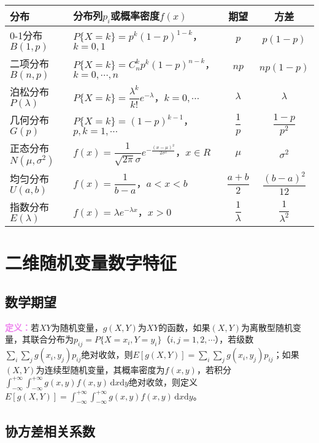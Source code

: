 \begin{center}
    \begin{tabular}{|m{50pt}<{\centering}|m{220pt}<{\centering}|c|c|}
        \hline
        分布 & 分布列$p_i$或概率密度$f(x)$ & 期望 & 方差 \\ \hline
        0-1分布$B(1,p)$ & $P\{X=k\}=p^k(1-p)^{1-k}$，$k=0,1$ & $p$ & $p(1-p)$ \\ \hline
        二项分布$B(n,p)$ & $P\{X=k\}=C_n^kp^k(1-p)^{n-k}$，$k=0,\cdots,n$ & $np$ & $np(1-p)$ \\ \hline
        泊松分布$P(\lambda)$ & $P\{X=k\}=\dfrac{\lambda^k}{k!}e^{-\lambda}$，$k=0,\cdots$ & $\lambda$ & $\lambda$ \\ \hline
        几何分布$G(p)$ & $P\{X=k\}=(1-p)^{k-1}$，$p,k=1,\cdots$ & $\dfrac{1}{p}$ & $\dfrac{1-p}{p^2}$ \\ \hline
        正态分布$N(\mu,\sigma^2)$ & $f(x)=\dfrac{1}{\sqrt{2\pi}\sigma}e^{-\frac{(x-\mu)^2}{2\sigma^2}}$，$x\in R$ & $\mu$ & $\sigma^2$ \\ \hline
        均匀分布$U(a,b)$ & $f(x)=\dfrac{1}{b-a}$，$a<x<b$ & $\dfrac{a+b}{2}$ & $\dfrac{(b-a)^2}{12}$ \\ \hline
        指数分布$E(\lambda)$ & $f(x)=\lambda e^{-\lambda x}$，$x>0$ & $\dfrac{1}{\lambda}$ & $\dfrac{1}{\lambda^2}$ \\ \hline
    \end{tabular}
\end{center}

\section{二维随机变量数字特征}

\subsection{数学期望}

\textcolor{violet}{\textbf{定义：}}若$XY$为随机变量，$g(X,Y)$为$XY$的函数，如果$(X,Y)$为离散型随机变量，其联合分布为$p_{ij}=P\{X=x_i,Y=y_i\}$（$i,j=1,2,\cdots$），若级数$\sum\limits_i\sum\limits_jg(x_i,y_j)p_{ij}$绝对收敛，则$E[g(X,Y)]=\sum\limits_i\sum\limits_jg(x_i,y_j)p_{ij}$；如果$(X,Y)$为连续型随机变量，其概率密度为$f(x,y)$，若积分$\int_{-\infty}^{+\infty}\int_{-\infty}^{+\infty}g(x,y)f(x,y)\,\textrm{d}x\textrm{d}y$绝对收敛，则定义$E[g(X,Y)]=\int_{-\infty}^{+\infty}\int_{-\infty}^{+\infty}g(x,y)f(x,y)\,\textrm{d}x\textrm{d}y$。

\subsection{协方差相关系数}

